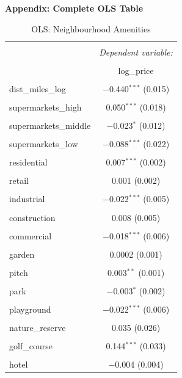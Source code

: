 \documentclass{article}
\begin{document}
\newpage
\textbf{Appendix: Complete OLS Table}
\begin{table}[H] \centering 
  \caption{OLS: Neighbourhood Amenities} 
  \label{table:complete} 
\small 
\begin{tabular}{@{\extracolsep{-10pt}}lc} 
\\[-1.8ex]\hline 
\hline \\[-1.8ex] 
 & \multicolumn{1}{c}{\textit{Dependent variable:}} \\ 
\cline{2-2} 
\\[-1.8ex] & log\_price \\ 
\hline \\[-1.8ex] 
 dist\_miles\_log & $-$0.440$^{***}$ (0.015) \\ 
  & \\ 
 supermarkets\_high & 0.050$^{***}$ (0.018) \\ 
  & \\ 
 supermarkets\_middle & $-$0.023$^{*}$ (0.012) \\ 
  & \\ 
 supermarkets\_low & $-$0.088$^{***}$ (0.022) \\ 
  & \\ 
 residential & 0.007$^{***}$ (0.002) \\ 
  & \\ 
 retail & 0.001 (0.002) \\ 
  & \\ 
 industrial & $-$0.022$^{***}$ (0.005) \\ 
  & \\ 
 construction & 0.008 (0.005) \\ 
  & \\ 
 commercial & $-$0.018$^{***}$ (0.006) \\ 
  & \\ 
 garden & 0.0002 (0.001) \\ 
  & \\ 
 pitch & 0.003$^{**}$ (0.001) \\ 
  & \\ 
 park & $-$0.003$^{*}$ (0.002) \\ 
  & \\ 
 playground & $-$0.022$^{***}$ (0.006) \\ 
  & \\ 
 nature\_reserve & 0.035 (0.026) \\ 
  & \\ 
 golf\_course & 0.144$^{***}$ (0.033) \\ 
  & \\ 
 hotel & $-$0.004 (0.004) \\ 

\end{tabular}
\end{table}
\end{document}
